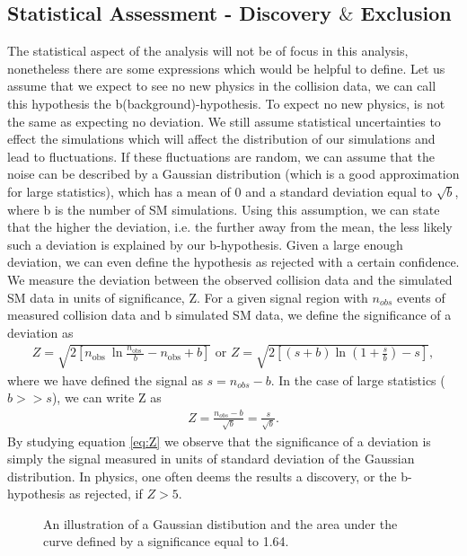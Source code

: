 \subsection{Statistical Assessment - Discovery $\&$ Exclusion}\label{subsec:Sensitivity}
The statistical aspect of the analysis will not be of focus in this analysis, nonetheless there are 
some expressions which would be helpful to define. Let us assume that we expect to see no new physics in the collision
data, we can call this hypothesis the b(background)-hypothesis. To expect no new physics, is not the same as expecting no 
deviation. We still assume statistical uncertainties to effect the simulations which will affect the distribution of our 
simulations and lead to fluctuations. If these fluctuations are random, we can assume that the noise can be described by a Gaussian distribution 
(which is a good approximation for large statistics), which has a mean of 0 and a standard deviation equal to $\sqrt{b}$, where b is 
the number of \ac{SM} simulations. Using this assumption, we can state that the higher the deviation, i.e. the further away 
from the mean, the less likely such a deviation is explained by our b-hypothesis. Given a large enough deviation, we can even 
define the hypothesis as rejected with a certain confidence.
\\
We measure the deviation between the observed collision data and the simulated \ac{SM} data in units of significance, Z. 
For a given signal region with $n_{obs}$ events of measured collision data and b simulated \ac{SM} data, we define
the significance of a deviation as
\begin{align}\label{eq:Z1}
Z=\sqrt{2\left[n_{\text {obs }} \ln \frac{n_{\text {obs }}}{b}-n_{\mathrm{obs}}+b\right]} \text { or } 
Z=\sqrt{2\left[(s+b) \ln \left(1+\frac{s}{b}\right)-s\right]}, 
\end{align}
where we have defined the signal as $s = n_{obs} - b$. In the case of large statistics ($b>>s$), we can write Z 
as 
\begin{align}\label{eq:Z}
    Z=\frac{n_{o b s}-b}{\sqrt{b}} = \frac{s}{\sqrt{b}}.
\end{align}
By studying equation \ref{eq:Z} we observe that the significance of a deviation is simply the signal measured in units of standard
deviation of the Gaussian distribution. In physics, one often deems the results a discovery, or the b-hypothesis as rejected, if $Z>5$. 
\\
\begin{figure}[H]
    \centering
    \caption{An illustration of a Gaussian distibution and the area under the curve defined by a significance equal to 1.64.}
    \label{fig:ConfInt}
\end{figure}
